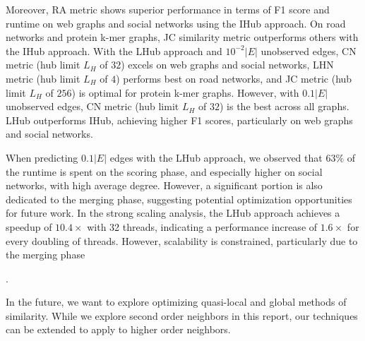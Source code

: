 Moreover, RA metric shows superior performance in terms of F1 score and runtime on web graphs and social networks using the IHub approach. On road networks and protein k-mer graphs, JC similarity metric outperforms others with the IHub approach. With the LHub approach and $10^{-2}|E|$ unobserved edges, CN metric (hub limit $L_H$ of $32$) excels on web graphs and social networks, LHN metric (hub limit $L_H$ of $4$) performs best on road networks, and JC metric (hub limit $L_H$ of $256$) is optimal for protein k-mer graphs. However, with $0.1|E|$ unobserved edges, CN metric (hub limit $L_H$ of $32$) is the best across all graphs. LHub outperforms IHub, achieving higher F1 scores, particularly on web graphs and social networks.

When predicting $0.1|E|$ edges with the LHub approach, we observed that $63\%$ of the runtime is spent on the scoring phase, and especially higher on social networks, with high average degree. However, a significant portion is also dedicated to the merging phase, suggesting potential optimization opportunities for future work. In the strong scaling analysis, the LHub approach achieves a speedup of $10.4\times$ with 32 threads, indicating a performance increase of $1.6\times$ for every doubling of threads. However, scalability is constrained, particularly due to the merging phase.

In the future, we want to explore optimizing quasi-local and global methods of similarity. While we explore second order neighbors in this report, our techniques can be extended to apply to higher order neighbors.

